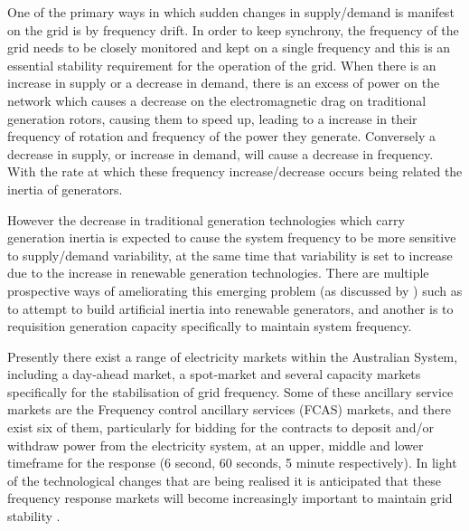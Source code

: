 One of the primary ways in which sudden changes in supply/demand is manifest on the grid is by frequency drift.
In order to keep synchrony, the frequency of the grid needs to be closely monitored and kept on a single frequency and this is an essential stability requirement for the operation of the grid.
When there is an increase in supply or a decrease in demand, there is an excess of power on the network which causes a decrease on the electromagnetic drag on traditional generation rotors, causing them to speed up, leading to a increase in their frequency of rotation and frequency of the power they generate.
Conversely a decrease in supply, or increase in demand, will cause a decrease in frequency. With the rate at which these frequency increase/decrease occurs being related the inertia of generators.

However the decrease in traditional generation technologies which carry generation inertia is expected to cause the system frequency to be more sensitive to supply/demand variability, at the same time that variability is set to increase due to the increase in renewable generation technologies.
There are multiple prospective ways of ameliorating this emerging problem (as discussed by \cite{doi:10.1002/2050-7038.12128}) such as to attempt to build artificial inertia into renewable generators, and another is to requisition generation capacity specifically to maintain system frequency.

Presently there exist a range of electricity markets within the Australian System, including a day-ahead market, a spot-market and several capacity markets specifically for the stabilisation of grid frequency.
Some of these ancillary service markets are the Frequency control ancillary services (FCAS) markets, and there exist six of them, particularly for bidding for the contracts to deposit and/or withdraw power from the electricity system, at an upper, middle and lower timeframe for the response (6 second, 60 seconds, 5 minute respectively).
In light of the technological changes that are being realised it is anticipated that these frequency response markets will become increasingly important to maintain grid stability \citep{RIESZ201586}.


